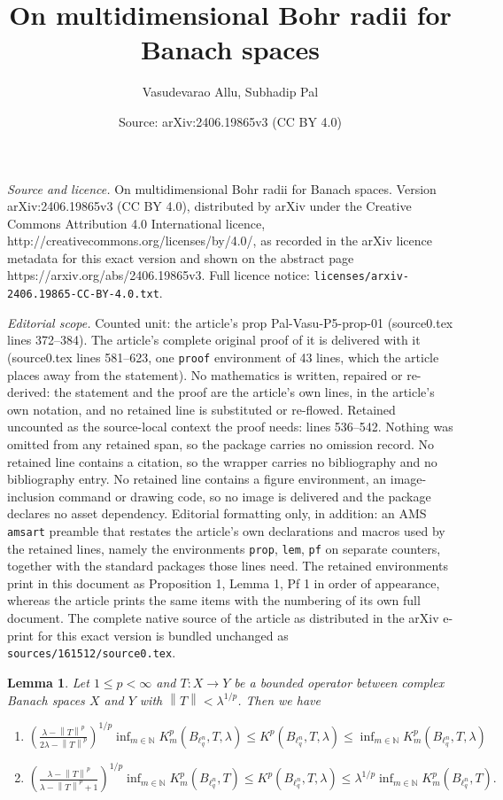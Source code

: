 \documentclass[10pt,a4paper]{amsart}
\title{On multidimensional Bohr radii for Banach spaces}
\author{Vasudevarao Allu, Subhadip Pal}
\date{Source: arXiv:2406.19865v3 (CC BY 4.0)}
\newtheorem{lem}{Lemma}
\newcommand{\norm}[1]{\left\lVert#1\right\rVert}
\begin{document}
\maketitle

\noindent\emph{Source and licence.} On multidimensional Bohr radii for Banach spaces. Version arXiv:2406.19865v3 (CC BY 4.0), distributed by arXiv under the Creative Commons Attribution 4.0 International licence, http://creativecommons.org/licenses/by/4.0/, as recorded in the arXiv licence metadata for this exact version and shown on the abstract page https://arxiv.org/abs/2406.19865v3. Full licence notice: \texttt{licenses/arxiv-2406.19865-CC-BY-4.0.txt}.\par\smallskip

\noindent\textit{Editorial scope.} Counted unit: the article's prop Pal-Vasu-P5-prop-01 (source0.tex lines 372--384). The article's complete original proof of it is delivered with it (source0.tex lines 581--623, one \texttt{proof} environment of 43 lines, which the article places away from the statement). No mathematics is written, repaired or re-derived: the statement and the proof are the article's own lines, in the article's own notation, and no retained line is substituted or re-flowed.  Retained uncounted as the source-local context the proof needs: lines 536--542.  Nothing was omitted from any retained span, so the package carries no omission record.  No retained line contains a citation, so the wrapper carries no bibliography and no bibliography entry.  No retained line contains a figure environment, an image-inclusion command or drawing code, so no image is delivered and the package declares no asset dependency.  Editorial formatting only, in addition: an AMS \texttt{amsart} preamble that restates the article's own declarations and macros used by the retained lines, namely the environments \texttt{prop}, \texttt{lem}, \texttt{pf} on separate counters, together with the standard packages those lines need.  The retained environments print in this document as Proposition 1, Lemma 1, Pf 1 in order of appearance, whereas the article prints the same items with the numbering of its own full document.  The complete native source of the article as distributed in the arXiv e-print for this exact version is bundled unchanged as \texttt{sources/161512/source0.tex}.
\begin{lem}\label{Pal-Vasu-P5-Lemma-01}
	Let  $1\leq p<\infty$ and $T:X\rightarrow Y$ be a bounded operator between complex Banach spaces $X$ and $Y$ with $\norm{T}<\lambda^{1/p}$. Then we have 
	\begin{enumerate}
		\item[(a)] $\left(\frac{\lambda-\norm{T}^p}{2\lambda-\norm{T}^p}\right)^{1/p}\inf_{m\in \mathbb{N}}K^p_m(B_{\ell^n_q}, T, \lambda)\leq K^p(B_{\ell^n_q},T,\lambda)\leq \inf_{m\in \mathbb{N}}K^p_m(B_{\ell^n_q},T,\lambda)$
		\item[(b)] $\left(\frac{\lambda-\norm{T}^p}{\lambda-\norm{T}^p+1}\right)^{1/p}\inf_{m\in\mathbb{N}}K^p_m(B_{\ell^n_q},T)\leq K^p(B_{\ell^n_q},T,\lambda)\leq \lambda^{1/p} \inf_{m\in \mathbb{N}}K^p_m(B_{\ell^n_q},T).$
	\end{enumerate}
\end{lem}
\end{document}
